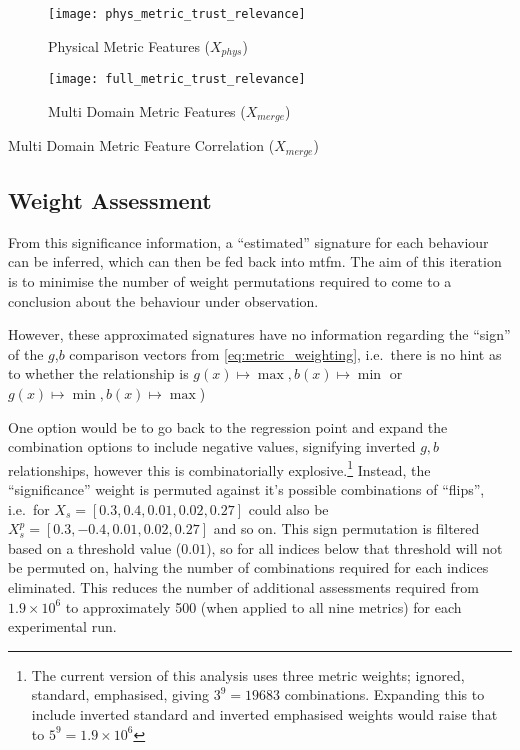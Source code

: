 \begin{figure}[h!]
  \centering
  \texttt{[image: phys\_metric\_trust\_relevance]}
  \caption{Physical Metric Features ($X_{phys}$)}
  \label{fig:phys_feature_extraction}
\end{figure}

\begin{figure}[h!]
  \centering
  \texttt{[image: full\_metric\_trust\_relevance]}
  \caption{Multi Domain  Metric Features ($X_{merge}$)}
  \label{fig:multi_feature_extraction}
\end{figure}

\begin{table}
  \centering
  \caption{Multi Domain Metric Feature Correlation ($X_{merge}$)}
  
  \label{tab:full_metric_correlations}
\end{table}



\subsection{Weight Assessment}\label{sec:weight_assessment}

From this significance information, a ``estimated'' signature for each behaviour can be inferred, which can then be fed back into \gls{mtfm}. 
The aim of this iteration is to minimise the number of weight permutations required to come to a conclusion about the behaviour under observation. 

However, these approximated signatures have no information regarding the ``sign'' of the  $g$,$b$ comparison vectors from \eqref{eq:metric_weighting}, i.e.\ there is no hint as to whether the relationship is $g(x) \mapsto \max, b(x) \mapsto \min$ or $g(x) \mapsto \min, b(x) \mapsto \max$)  

One option would be to go back to the regression point and expand the combination options to include negative values, signifying inverted $g,b$ relationships, however this is combinatorially explosive.\footnote{The current version of this analysis uses three metric weights; ignored, standard, emphasised, giving $3^9 = 19683$ combinations. Expanding this to include inverted standard and inverted emphasised weights would raise that to $5^9 = 1.9\times 10^6$}
Instead, the ``significance'' weight is permuted against it's possible combinations of ``flips'', i.e.\ for $X_s=[0.3,0.4,0.01,0.02,0.27]$ could also be $X_s^p=[0.3,-0.4,0.01,0.02,0.27]$ and so on. 
This sign permutation is filtered based on a threshold value ($0.01$), so for all indices below that threshold will not be permuted on, halving the number of combinations required for each indices eliminated.
This reduces the number of additional assessments required from $1.9\times 10^6$ to approximately 500 (when applied to all nine metrics) for each experimental run.

